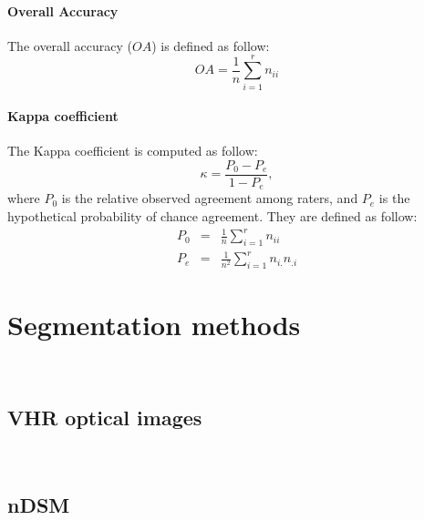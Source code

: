 \paragraph{Overall Accuracy \\}
The overall accuracy ($OA$) is defined as follow:
\begin{equation}
OA=\frac{1}{n}\sum_{i=1}^{r}n_{ii}
\end{equation}

\paragraph{Kappa coefficient\\} %
The Kappa coefficient is computed as follow:
\begin{equation}
\kappa=\frac{P_{0}-P_{e}}{1-P_{e}},
\end{equation}
where $P_{0}$ is the relative observed agreement among raters, and $P_{e}$ is the hypothetical probability of chance agreement. They are defined as follow:
\begin{eqnarray}
P_{0} & = & \frac{1}{n}\sum_{i=1}^{r}n_{ii} \\
P_{e} & = & \frac{1}{n^{2}}\sum_{i=1}^{r}n_{i.}n_{.i}
\end{eqnarray}

\section{Segmentation methods}~\vspace*{-1cm}
~\vspace*{-1cm}

\subsection{VHR optical images}~\vspace*{-1cm}
~\vspace*{-1cm}
~\vspace*{-1cm}

\subsection{nDSM}~\vspace*{-1cm}
~\vspace*{-1cm}
~\vspace*{-1cm}

